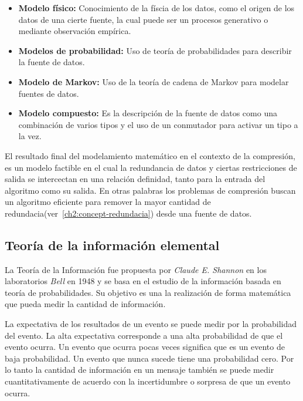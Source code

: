 \begin{itemize}
	\menorEspacioItemize
	\item \textbf{Modelo físico:} Conocimiento de la físcia de los datos, como el origen de los datos de una cierte fuente, la cual puede ser un procesos generativo o mediante observación empírica.

	\item \textbf{Modelos de probabilidad:} Uso de teoría de probabilidades para describir la fuente de datos.


	\item \textbf{Modelo de Markov:} Uso de la teoría de cadena de Markov para modelar fuentes de datos.


	\item \textbf{Modelo compuesto:} Es la descripción de la fuente de datos como una combinación de varios tipos y el uso de un conmutador para activar un tipo a la vez.
\end{itemize}

El resultado final del modelamiento matemático en el contexto de la compresión, es un modelo factible en el cual la redundancia de datos y ciertas restricciones de salida se intercectan en una relación definidad, tanto para la entrada del algoritmo como su salida. En otras palabras los problemas de compresión  buscan un algoritmo eficiente para remover la mayor cantidad de redundacia(ver~\ref{ch2:concept-redundacia}) desde una fuente de datos.

\uncm
 




\subsection{Teoría de la información elemental}


La Teoría de la Información fue propuesta por \emph{Claude E. Shannon} en los laboratorios \emph{Bell} en 1948 y se basa en el estudio de la información basada en teoría de probabilidades. Su objetivo es una la realización de forma matemática que pueda medir la cantidad de información.

La expectativa de los resultados de un evento se puede medir por la probabilidad del evento. La alta expectativa corresponde a una alta probabilidad de que el evento ocurra. Un evento que ocurra pocas veces significa que es un evento de baja probabilidad. Un evento que nunca sucede tiene una probabilidad cero. Por lo tanto la cantidad de información en un mensaje también se puede medir cuantitativamente de acuerdo con la incertidumbre o sorpresa de que un evento ocurra.





